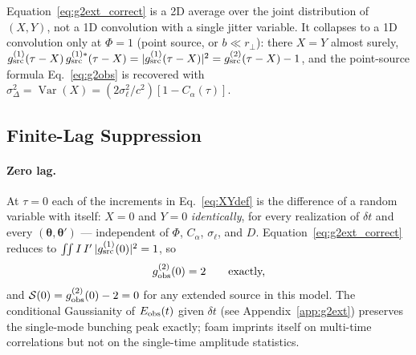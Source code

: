 \documentclass[aps,prd,onecolumn,amsmath,amssymb]{revtex4-2}
\begin{document}
Equation~\eqref{eq:g2ext_correct} is a 2D average over the joint
distribution of $(X,Y)$, not a 1D convolution with a single jitter
variable.  It collapses to a 1D convolution only at $\Phi = 1$ (point
source, or $b\ll r_\perp$): there $X = Y$ almost surely,
$g^{(1)}_{\rm src}(\tau-X)\,g^{(1)*}_{\rm src}(\tau-X) =
|g^{(1)}_{\rm src}(\tau-X)|^2 = g^{(2)}_{\rm src}(\tau-X) - 1$, and the
point-source formula Eq.~\eqref{eq:g2obs} is recovered with
$\sigma_\Delta^2 = \operatorname{Var}(X) =
(2\sigma_\ell^2/c^2)[1-C_\alpha(\tau)]$.

\subsection{Finite-Lag Suppression}
\label{sec:zerolag}

\paragraph{Zero lag.}
At $\tau=0$ each of the increments in Eq.~\eqref{eq:XYdef} is the
difference of a random variable with itself: $X = 0$ and $Y = 0$
\emph{identically}, for every realization of $\delta t$ and every
$(\boldsymbol{\theta},\boldsymbol{\theta}')$ --- independent of $\Phi$,
$C_\alpha$, $\sigma_\ell$, and $D$.  Equation~\eqref{eq:g2ext_correct}
reduces to $\int\!\!\int I\,I'\,|g^{(1)}_{\rm src}(0)|^2 = 1$, so
\begin{equation}
  g^{(2)}_{\rm obs}(0) = 2 \qquad \text{exactly,}
  \label{eq:g2zero_exact}
\end{equation}
and $\mathcal{S}(0) = g^{(2)}_{\rm obs}(0) - 2 = 0$ for any extended source
in this model.  The conditional Gaussianity of $E_{\rm obs}(t)$ given
$\delta t$ (see Appendix~\ref{app:g2ext}) preserves the single-mode
bunching peak exactly; foam imprints itself on multi-time correlations
but not on the single-time amplitude statistics.
\end{document}
